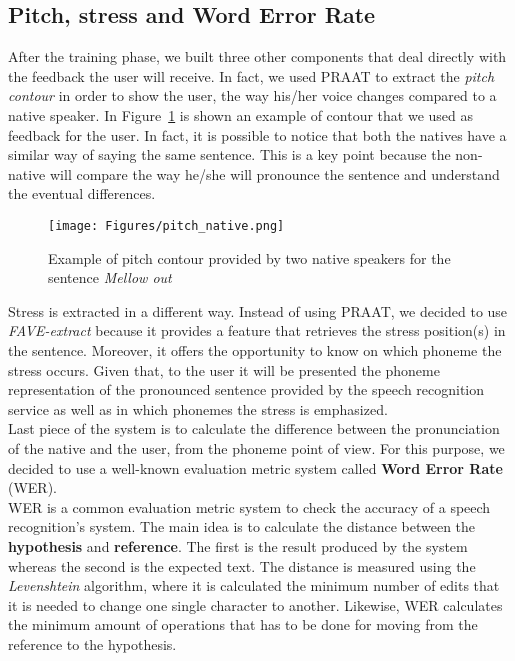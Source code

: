 \subsection{Pitch, stress and Word Error Rate}
\noindent After the training phase, we built three other components that deal directly with the feedback the user will receive. In fact, we used PRAAT to extract the \textit{pitch contour} in order to show the user, the way his/her voice changes compared to a native speaker. In Figure~\ref{fig:pitch_native} is shown an example of contour that we used as feedback for the user. In fact, it is possible to notice that both the natives have a similar way of saying the same sentence. This is a key point because the non-native will compare the way he/she will pronounce the sentence and understand the eventual differences. \\

\begin{figure}[!ht]
	\centering
	\texttt{[image: Figures/pitch\_native.png]}
	\caption{Example of pitch contour provided by two native speakers for the sentence \textit{Mellow out}}
	\label{fig:pitch_native}
\end{figure}

\noindent Stress is extracted in a different way. Instead of using PRAAT, we decided to use \textit{FAVE-extract} because it provides a feature that retrieves the stress position(s) in the sentence. Moreover, it offers the opportunity to know on which phoneme the stress occurs. Given that, to the user it will be presented the phoneme representation of the pronounced sentence provided by the speech recognition service as well as in which phonemes the stress is emphasized. \\

\noindent Last piece of the system is to calculate the difference between the pronunciation of the native and the user, from the phoneme point of view. For this purpose, we decided to use a well-known evaluation metric system called \textbf{Word Error Rate} (WER). \\

\noindent WER is a common evaluation metric system to check the accuracy of a speech recognition's system. The main idea is to calculate the distance between the \textbf{hypothesis} and \textbf{reference}. The first is the result produced by the system whereas the second is the expected text. The distance is measured using the \textit{Levenshtein} algorithm, where it is calculated the minimum number of edits that it is needed to change one single character to another. Likewise, WER calculates the minimum amount of operations that has to be done for moving from the reference to the hypothesis. \\ \\ \\ \\

